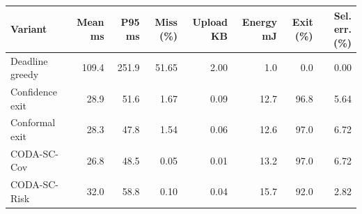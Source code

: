 \begin{tabular}{lrrrrrrr}
\toprule
Variant & Mean ms & P95 ms & Miss (\%) & Upload KB & Energy mJ & Exit (\%) & Sel. err. (\%) \\
\midrule
Deadline greedy & 109.4 & 251.9 & 51.65 & 2.00 & 1.0 & 0.0 & 0.00 \\
Confidence exit & 28.9 & 51.6 & 1.67 & 0.09 & 12.7 & 96.8 & 5.64 \\
Conformal exit & 28.3 & 47.8 & 1.54 & 0.06 & 12.6 & 97.0 & 6.72 \\
CODA-SC-Cov & 26.8 & 48.5 & 0.05 & 0.01 & 13.2 & 97.0 & 6.72 \\
CODA-SC-Risk & 32.0 & 58.8 & 0.10 & 0.04 & 15.7 & 92.0 & 2.82 \\
\bottomrule
\end{tabular}

